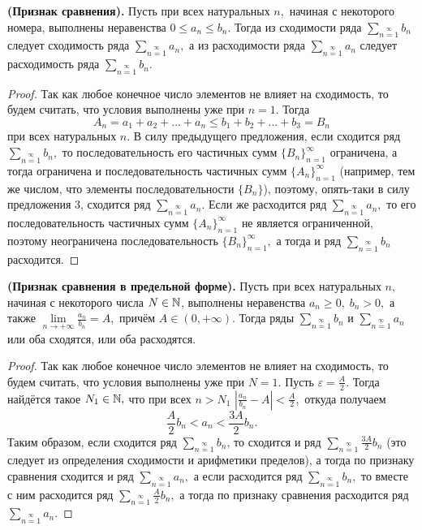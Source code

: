 \begin{theorem} \textbf{(Признак сравнения).}
    Пусть при всех натуральных $n,$
    начиная с некоторого номера,
    выполнены неравенства $0\leq a_n
        \leq b_n.$ Тогда из сходимости
    ряда $\sum\limits_{n=1}\limits^{\infty}b_n$
    следует сходимость ряда
    $\sum\limits_{n=1}\limits^{\infty}a_n,$
    а из расходимости ряда
    $\sum\limits_{n=1}\limits^{\infty}a_n$
    следует расходимость ряда
    $\sum\limits_{n=1}\limits^{\infty}b_n.$
\end{theorem}
\begin{proof}
    Так как любое конечное число
    элементов не влияет на сходимость,
    то будем считать, что условия
    выполнены уже при $n=1.$
    Тогда $$A_n=a_1+a_2+...+a_n\leq
        b_1+b_2+...+b_3=B_n$$
    при всех натуральных $n.$
    В силу предыдущего предложения,
    если сходится ряд
    $\sum\limits_{n=1}\limits^{\infty}b_n,$
    то последовательность его частичных
    сумм $\{B_n\}_{n=1}^{\infty}$
    ограничена, а тогда ограничена
    и последовательность частичных
    сумм $\{A_n\}_{n=1}^{\infty}$
    (например, тем же числом, что
    элементы последовательности $\{B_n\}$),
    поэтому, опять-таки в силу
    предложения 3, сходится ряд
    $\sum\limits_{n=1}\limits^{\infty}a_n.$
    Если же расходится ряд
    $\sum\limits_{n=1}\limits^{\infty}a_n,$
    то его последовательность частичных
    сумм $\{A_n\}_{n=1}^{\infty}$
    не является ограниченной, поэтому
    неограничена последовательность
    $\{B_n\}_{n=1}^{\infty},$
    а тогда и ряд
    $\sum\limits_{n=1}\limits^{\infty}b_n$
    расходится.
\end{proof}

\begin{proposition} \textbf{(Признак сравнения в предельной форме).}
    Пусть при всех натуральных $n,$
    начиная с некоторого числа $N\in\mathbb{N}$,
    выполнены неравенства $a_n\geq0,\;b_n>0,$
    а также
    $\lim\limits_{n\rightarrow+\infty}\frac{a_n}{b_n}=A,$
    причём $A\in(0, +\infty).$
    Тогда ряды $\sum\limits_{n=1}\limits^{\infty}b_n$
    и $\sum\limits_{n=1}\limits^{\infty}a_n$
    или оба сходятся, или оба расходятся.
\end{proposition}
\begin{proof}
    Так как любое конечное число
    элементов не влияет на сходимость,
    то будем считать, что условия
    выполнены уже при $N=1.$
    Пусть $\varepsilon=\frac{A}{2}.$
    Тогда найдётся такое $N_1\in\mathbb{N},$
    что при всех $n>N_1$ $|\frac{a_n}{b_n}-
        A|<\frac{A}{2},$
    откуда получаем
    $$
        \frac{A}{2}b_n<a_n<\frac{3A}{2}b_n.
    $$
    Таким образом, если сходится ряд
    $\sum\limits_{n=1}\limits^{\infty}b_n$,
    то сходится и ряд
    $\sum\limits_{n=1}\limits^{\infty}\frac{3A}{2}b_n$
    (это следует из определения сходимости и арифметики
    пределов),
    а тогда по признаку сравнения сходится и ряд
    $\sum\limits_{n=1}\limits^{\infty}a_n,$
    а если расходится ряд
    $\sum\limits_{n=1}\limits^{\infty}b_n,$ то
    вместе с ним расходится ряд
    $\sum\limits_{n=1}\limits^{\infty}\frac{A}{2}b_n,$
    а тогда по признаку сравнения расходится ряд
    $\sum\limits_{n=1}\limits^{\infty}a_n.$
\end{proof}

